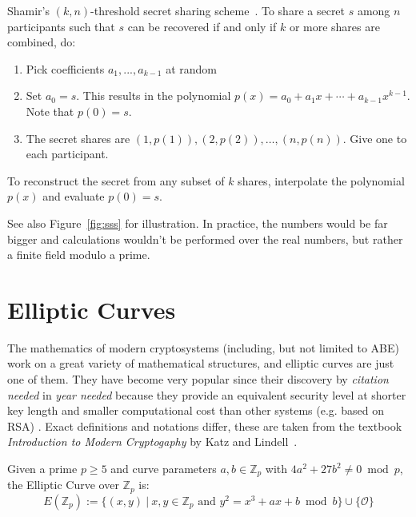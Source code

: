 \begin{definition}
    Shamir's $(k, n)$-threshold secret sharing scheme~\cite{shamir_how_1979}.
    To share a secret $s$ among $n$ participants such that $s$ can be recovered if and only if $k$ or more shares are combined, do:
    \begin{enumerate}
        \item Pick coefficients $a_1, ..., a_{k-1}$ at random 
        \item Set $a_0 = s$. This results in the polynomial $p(x) = a_0 + a_1x + \cdots + a_{k-1}x^{k-1}$. Note that $p(0) = s$.
        \item The secret shares are $(1, p(1)), (2, p(2)), \dots, (n, p(n))$. Give one to each participant.
    \end{enumerate}
    To reconstruct the secret from any subset of $k$ shares, interpolate the polynomial $p(x)$ and evaluate $p(0) = s$. 
\end{definition}

See also Figure~\ref{fig:sss} for illustration.
In practice, the numbers would be far bigger and calculations wouldn't be performed over the real numbers, but rather a finite field modulo a prime.~\cite{shamir_how_1979}

\section{Elliptic Curves}

The mathematics of modern cryptosystems (including, but not limited to ABE) work on a great variety of mathematical structures, and elliptic curves are just one of them.
They have become very popular since their discovery by \emph{citation needed} in \emph{year needed} because they provide an equivalent security level at shorter key length and smaller computational cost than other systems (e.g. based on RSA) \cite{katz_introduction_2015}.
Exact definitions and notations differ, these are taken from the textbook \emph{Introduction to Modern Cryptogaphy} by Katz and Lindell~\cite{katz_introduction_2015}.

\begin{definition}
    Given a prime $p \geq 5$ and curve parameters $a, b \in \mathbb{Z}_p$ with $4a^2 + 27b^2 \neq 0 \bmod{p}$, the Elliptic Curve over $\mathbb{Z}_p$ is:~\cite{katz_introduction_2015}
    \begin{equation}
        E(\mathbb{Z}_p) := \{(x, y)~|~x,y \in \mathbb{Z}_p \text{ and } y^2 = x^3 + a x + b \bmod{b}\} \cup \{\mathcal{O}\}
    \end{equation}
\end{definition}

